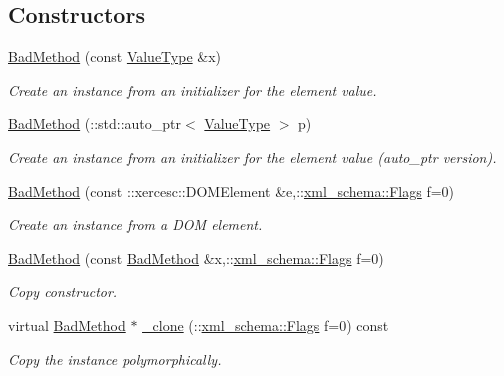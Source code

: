 \subsection*{Constructors}
\begin{DoxyCompactItemize}
\item 
\hyperlink{classopenstack_1_1xml_1_1BadMethod_ad6bf5b6dc08b0604cb715ccfe333542f}{BadMethod} (const \hyperlink{classopenstack_1_1xml_1_1BadMethodAPIFault}{ValueType} \&x)
\begin{DoxyCompactList}\small\item\em Create an instance from an initializer for the element value. \item\end{DoxyCompactList}\item 
\hyperlink{classopenstack_1_1xml_1_1BadMethod_aae458b54864ae7865fdbedd2c0467ffc}{BadMethod} (::std::auto\_\-ptr$<$ \hyperlink{classopenstack_1_1xml_1_1BadMethodAPIFault}{ValueType} $>$ p)
\begin{DoxyCompactList}\small\item\em Create an instance from an initializer for the element value (auto\_\-ptr version). \item\end{DoxyCompactList}\item 
\hyperlink{classopenstack_1_1xml_1_1BadMethod_a51b6558d756a12dd35c654025b8e8d45}{BadMethod} (const ::xercesc::DOMElement \&e,::\hyperlink{namespacexml__schema_affb4c227cbd9aa7453dd1dc5a1401943}{xml\_\-schema::Flags} f=0)
\begin{DoxyCompactList}\small\item\em Create an instance from a DOM element. \item\end{DoxyCompactList}\item 
\hyperlink{classopenstack_1_1xml_1_1BadMethod_a93acc51be5e2d16d0fd2c9ca4d5d4fe0}{BadMethod} (const \hyperlink{classopenstack_1_1xml_1_1BadMethod}{BadMethod} \&x,::\hyperlink{namespacexml__schema_affb4c227cbd9aa7453dd1dc5a1401943}{xml\_\-schema::Flags} f=0)
\begin{DoxyCompactList}\small\item\em Copy constructor. \item\end{DoxyCompactList}\item 
virtual \hyperlink{classopenstack_1_1xml_1_1BadMethod}{BadMethod} $\ast$ \hyperlink{classopenstack_1_1xml_1_1BadMethod_abe86fd3b4a201de668b3573ddc76a1ff}{\_\-clone} (::\hyperlink{namespacexml__schema_affb4c227cbd9aa7453dd1dc5a1401943}{xml\_\-schema::Flags} f=0) const 
\begin{DoxyCompactList}\small\item\em Copy the instance polymorphically. \item\end{DoxyCompactList}\end{DoxyCompactItemize}
